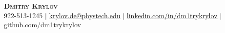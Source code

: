 \begin{center}
  \textbf{\Huge \scshape Dmitry Krylov} \\ \vspace{1pt}
  \small 922-513-1245 $|$ \href{mailto:krylov.de@phystech.edu}{\underline{krylov.de@phystech.edu}} $|$
  \href{https://linkedin.com/in/dm1trykrylov}{\underline{linkedin.com/in/dm1trykrylov}} $|$
  \href{https://github.com/dm1trykrylov}{\underline{github.com/dm1trykrylov}}
\end{center}